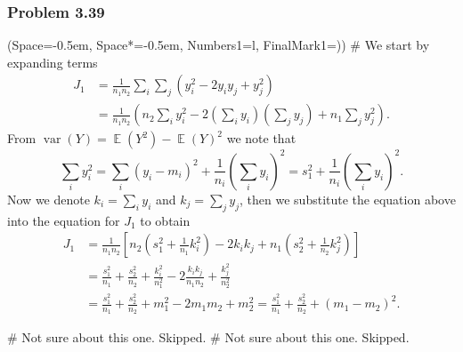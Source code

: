 \documentclass[12pt, a4paper]{article}
\newcommand{\listSpace}{-0.5em}%
\DeclareMathOperator{\E}{\mathbb{E}}
\DeclareMathOperator{\var}{\operatorname{var}}
\begin{document}
\subsubsection*{Problem 3.39}
\begin{easylist}[enumerate]
\ListProperties(Space=\listSpace, Space*=\listSpace, Numbers1=l, FinalMark1={)})
# We start by expanding terms
\begin{align*}
	J_1 &= \frac{1}{n_1 n_2} \sum_{i} \sum_{j} \left( y_i^2 - 2y_i y_j + y_j^2\right) \\ 
	&=
	\frac{1}{n_1 n_2} \left( n_2 \sum_i y_i^2 
	- 
	2\left( \sum_i y_i \right)\left( \sum_j y_j \right)
	+
	n_1 \sum_j y_j^2 
	 \right).
\end{align*}
From $\var(Y) = \E(Y^2) - \E(Y)^2$ we note that
\begin{equation*}
	\sum_i y_i^2 = \sum_i (y_i - m_i)^2 + \frac{1}{n_i} \left( \sum_i y_i \right)^2 = s_1^2 + \frac{1}{n_i} \left( \sum_i y_i \right)^2.
\end{equation*}
Now we denote $k_i = \sum_i y_i$ and $k_j = \sum_j y_j$,
then we substitute the equation above into the equation for $J_1$ to obtain
\begin{align*}
	J_1 &= \frac{1}{n_1 n_2} \left[
	n_2 \left( s_1^2 + \frac{1}{n_1} k_i^2 \right)
	- 2 k_i k_j
	+ n_1 \left( s_2^2 + \frac{1}{n_2} k_j^2 \right)
	\right] \\
	&= \frac{s_1^2}{n_1} + \frac{s_2^2}{n_2} + \frac{k_i^2}{n_1^2} - 2 \frac{k_i k_j}{n_1 n_2} + \frac{k_j^2}{n_2^2} \\
	&= \frac{s_1^2}{n_1} + \frac{s_2^2}{n_2} + 
	m_1^2 - 2 m_1 m_2 + m_2^2 = \frac{s_1^2}{n_1} + \frac{s_2^2}{n_2} + (m_1 - m_2)^2.
\end{align*}

# Not sure about this one. Skipped.
# Not sure about this one. Skipped. 
\end{easylist}
\end{document}
